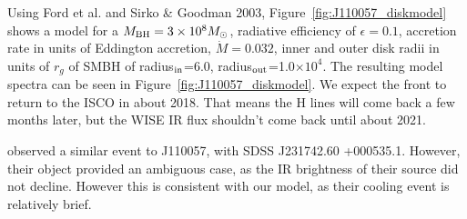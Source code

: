 \documentclass{nature}
\begin{document}
Using Ford et al. and Sirko \& Goodman 2003,
Figure~\ref{fig:J110057_diskmodel} shows a model for a $M_{\rm
BH}=3\times 10^{8} M_{\odot}$, radiative efficiency of $\epsilon=0.1$,
accretion rate in units of Eddington accretion, $\dot{M}=0.032$, inner
and outer disk radii in units of $r_g$ of SMBH of radius$_{\rm
in}$=6.0, radius$_{\rm out}$=1.0$\times 10^{4}$. The resulting model
spectra can be seen in Figure~\ref{fig:J110057_diskmodel}.  We expect
the front to return to the ISCO in about 2018. That means the H lines
will come back a few months later, but the WISE IR flux shouldn't come
back until about 2021.

\cite{Guo16} observed a similar event to J110057, with SDSS J231742.60
+000535.1. However, their object provided an ambiguous case, as the IR
brightness of their source did not decline. However this is consistent
with our model, as their cooling event is relatively brief.





%
%
\end{document}
